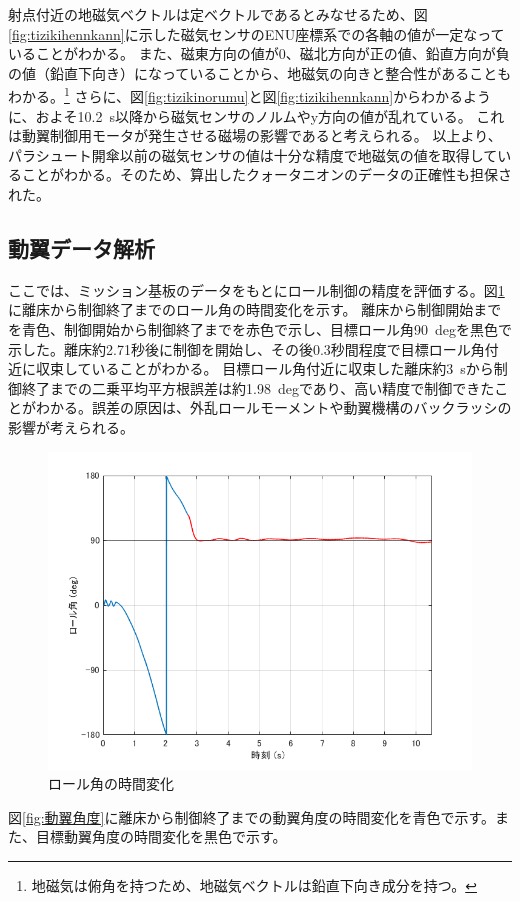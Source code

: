 \documentclass[a4paper,11pt,uplatex]{jsarticle}
\begin{document}
射点付近の地磁気ベクトルは定ベクトルであるとみなせるため、図\ref{fig:tizikihennkann}に示した磁気センサのENU座標系での各軸の値が一定なっていることがわかる。
また、磁東方向の値が$0$、磁北方向が正の値、鉛直方向が負の値（鉛直下向き）になっていることから、地磁気の向きと整合性があることもわかる。\footnote{地磁気は俯角を持つため、地磁気ベクトルは鉛直下向き成分を持つ。}
さらに、図\ref{fig:tizikinorumu}と図\ref{fig:tizikihennkann}からわかるように、およそ\SI{10.2}{s}以降から磁気センサのノルムやy方向の値が乱れている。
これは動翼制御用モータが発生させる磁場の影響であると考えられる。
以上より、パラシュート開傘以前の磁気センサの値は十分な精度で地磁気の値を取得していることがわかる。そのため、算出したクォータニオンのデータの正確性も担保された。

\subsection{動翼データ解析}
\label{sc:data_doyoku}
ここでは、ミッション基板のデータをもとにロール制御の精度を評価する。図\ref{fig:ロール角}に離床から制御終了までのロール角の時間変化を示す。
離床から制御開始までを青色、制御開始から制御終了までを赤色で示し、目標ロール角\SI{90}{deg}を黒色で示した。離床約2.71秒後に制御を開始し、その後0.3秒間程度で目標ロール角付近に収束していることがわかる。
目標ロール角付近に収束した離床約\SI{3}{s}から制御終了までの二乗平均平方根誤差は約\SI{1.98}{deg}であり、高い精度で制御できたことがわかる。誤差の原因は、外乱ロールモーメントや動翼機構のバックラッシの影響が考えられる。\par
\begin{figure}[H]
	\centering
	\includegraphics[width=0.8\linewidth]{pic_avi/ロール角.png}
	\caption{ロール角の時間変化}
	\label{fig:ロール角}
\end{figure}
図\ref{fig:動翼角度}に離床から制御終了までの動翼角度の時間変化を青色で示す。また、目標動翼角度の時間変化を黒色で示す。
\end{document}
